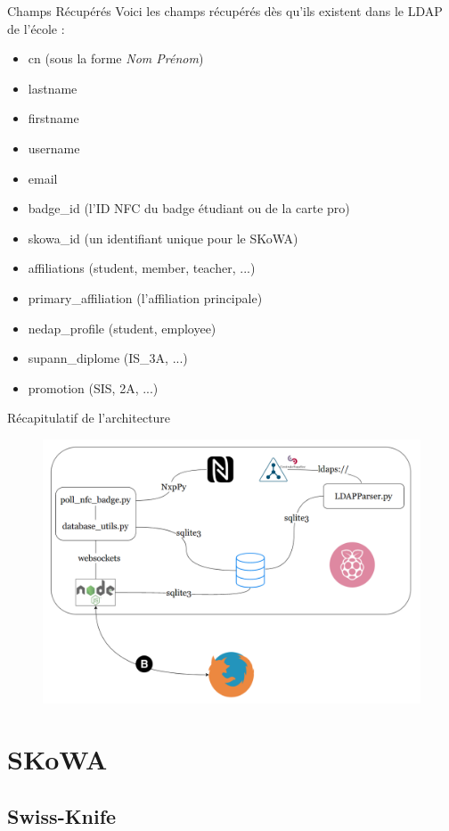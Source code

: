 \documentclass[aspectratio=169]{beamer}
\begin{document}
\begin{frame}{Champs Récupérés}
   Voici les champs récupérés dès qu'ils existent dans le LDAP de l'école :
   \begin{itemize}
       \item cn (sous la forme \textit{Nom Prénom})
       \item lastname
       \item firstname
       \item username
       \item email
       \item badge\_id (l'ID NFC du badge étudiant ou de la carte pro)
       \item skowa\_id (un identifiant unique pour le SKoWA)
       \item affiliations (student, member, teacher, ...)
       \item primary\_affiliation (l'affiliation principale)
       \item nedap\_profile (student, employee)
       \item supann\_diplome (IS\_3A, ...)
       \item promotion (SIS, 2A, ...)
   \end{itemize}
\end{frame}

\begin{frame}{Récapitulatif de l'architecture}
    \begin{figure}
        \centering
        \includegraphics[width=.45\textwidth]{../assets/architectureraspberrypi.png}
    \end{figure}
\end{frame}

\section{SKoWA}

\subsection{Swiss-Knife}
\end{document}
